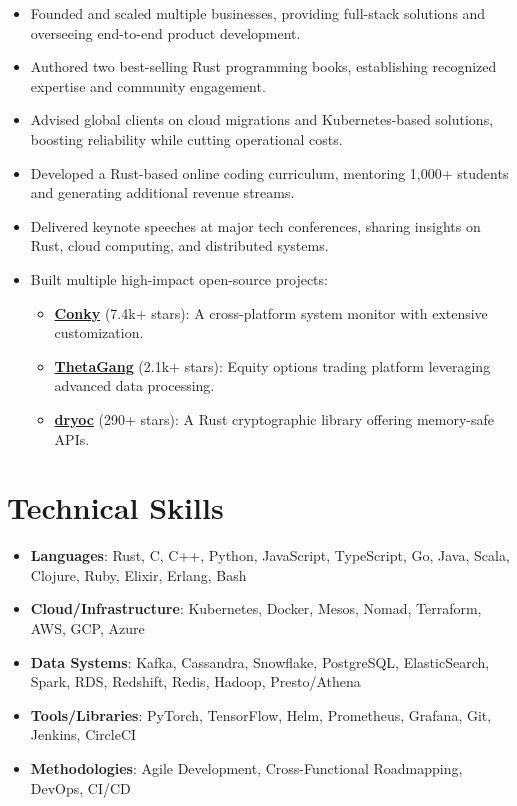 \documentclass[margin,line]{resume}
\begin{document}
\begin{resume}
\begin{itemize}
    \item Founded and scaled multiple businesses, providing full-stack solutions and overseeing end-to-end product development.
    \item Authored two best-selling Rust programming books, establishing recognized expertise and community engagement.
    \item Advised global clients on cloud migrations and Kubernetes-based solutions, boosting reliability while cutting operational costs.
    \item Developed a Rust-based online coding curriculum, mentoring 1,000+ students and generating additional revenue streams.
    \item Delivered keynote speeches at major tech conferences, sharing insights on Rust, cloud computing, and distributed systems.
    \item Built multiple high-impact open-source projects:
        \begin{itemize}
            \item \href{https://github.com/brndnmtthws/conky/}{\textbf{Conky}} (7.4k+ stars): A cross-platform system monitor with extensive customization.
            \item \href{https://github.com/brndnmtthws/thetagang/}{\textbf{ThetaGang}} (2.1k+ stars): Equity options trading platform leveraging advanced data processing.
            \item \href{https://github.com/brndnmtthws/dryoc/}{\textbf{dryoc}} (290+ stars): A Rust cryptographic library offering memory-safe APIs.
        \end{itemize}
\end{itemize}

\vspace{10pt}

\section{Technical Skills}

\begin{itemize}[nosep]
    \item \textbf{Languages}: Rust, C, C++, Python, JavaScript, TypeScript, Go, Java, Scala, Clojure, Ruby, Elixir, Erlang, Bash
    \item \textbf{Cloud/Infrastructure}: Kubernetes, Docker, Mesos, Nomad, Terraform, AWS, GCP, Azure
    \item \textbf{Data Systems}: Kafka, Cassandra, Snowflake, PostgreSQL, ElasticSearch, Spark, RDS, Redshift, Redis, Hadoop, Presto/Athena
    \item \textbf{Tools/Libraries}: PyTorch, TensorFlow, Helm, Prometheus, Grafana, Git, Jenkins, CircleCI
    \item \textbf{Methodologies}: Agile Development, Cross-Functional Roadmapping, DevOps, CI/CD
\end{itemize}


\end{resume}
\end{document}

